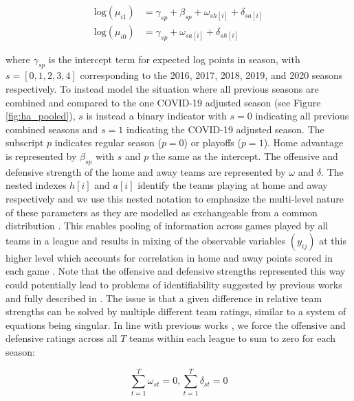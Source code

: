\begin{equation} \label{eq:expected points}
\begin{split}
\text{log}(\mu_{i1}) &= \gamma_{sp} + \beta_{sp} + \omega_{sh[i]} + \delta_{sa[i]} \\
\text{log}(\mu_{i0}) &= \gamma_{sp} + \omega_{sa[i]} + \delta_{sh[i]}
\end{split}
\end{equation}

where \(\gamma_{sp}\) is the intercept term for expected log points in season, with \(s = [0, 1, 2, 3, 4]\) corresponding to the 2016, 2017, 2018, 2019, and 2020 seasons respectively. To instead model the situation where all previous seasons are combined and compared to the one COVID-19 adjusted season (see Figure \ref{fig:ha_pooled}), \(s\) is instead a binary indicator with \(s=0\) indicating all previous combined seasons and \(s=1\) indicating the COVID-19 adjusted season. The subscript \(p\) indicates regular season (\(p=0\)) or playoffs (\(p=1\)). Home advantage is represented by \(\beta_{sp}\) with \(s\) and \(p\) the same as the intercept. The offensive and defensive strength of the home and away teams are represented by \(\omega\) and \(\delta\). The nested indexes \(h[i]\) and \(a[i]\) identify the teams playing at home and away respectively and we use this nested notation to emphasize the multi-level nature of these parameters as they are modelled as exchangeable from a common distribution \cite{McElreath2020} \cite{Gelman2014} \cite{Gelman2006}. This enables pooling of information across games played by all teams in a league and results in mixing of the observable variables \((y_{ij})\) at this higher level which accounts for correlation in home and away points scored in each game \cite{Baio2010}. Note that the offensive and defensive strengths represented this way could potentially lead to problems of identifiability suggested by previous works \cite{Baio2010} \cite{Benz2020} \cite{Karlis2003} and fully described in \cite{McElreath2020}. The issue is that a given difference in relative team strengths can be solved by multiple different team ratings, similar to a system of equations being singular. In line with previous works \cite{Baio2010} \cite{Benz2020} \cite{Karlis2003}, we force the offensive and defensive ratings across all $T$ teams within each league to sum to zero for each season:

\begin{equation} \label{eq:sum to zero}
\sum_{t=1}^{T} \omega_{st} = 0, \sum_{t=1}^{T} \delta_{st} = 0
\end{equation}

